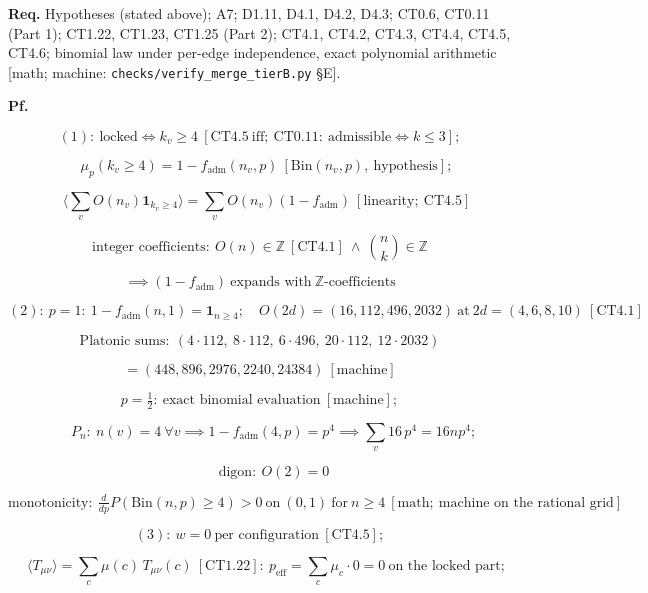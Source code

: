 \begin{theorem}[{\texorpdfstring{CT4.5a — The flicker-dust ensemble: exact density polynomial and rate-invariant $w=0$}{CT4.5a - The flicker-dust ensemble: exact density polynomial and rate-invariant}}]
\textbf{Req.} Hypotheses (stated above); A7; D1.11, D4.1, D4.2, D4.3; CT0.6, CT0.11 (Part 1); CT1.22, CT1.23, CT1.25 (Part 2); CT4.1, CT4.2, CT4.3, CT4.4, CT4.5, CT4.6; binomial law under per-edge independence, exact polynomial arithmetic [math; machine: \texttt{checks/\allowbreak{}verify\_\allowbreak{}merge\_\allowbreak{}tierB.py} §E].

\textbf{Pf.}

\[
(1):\ \text{locked}\iff k_v\ge4\ [\mathrm{CT4.5}\ \text{iff};\ \mathrm{CT0.11}:\ \text{admissible}\iff k\le3];
\]

\[
\quad \mu_p(k_v\ge4)=1-f_{\mathrm{adm}}(n_v,p)\ [\mathrm{Bin}(n_v,p),\ \text{hypothesis}];
\]

\[
\quad \bigl\langle\textstyle\sum_v O(n_v)\mathbf 1_{k_v\ge4}\bigr\rangle=\sum_v O(n_v)(1-f_{\mathrm{adm}})\ [\text{linearity};\ \mathrm{CT4.5}]
\]

\[
\text{integer coefficients}:\ O(n)\in\mathbb Z\ [\mathrm{CT4.1}]\ \wedge\ \binom{n}{k}\in\mathbb Z
\]

\[
\implies (1-f_{\mathrm{adm}})\ \text{expands with}\ \mathbb Z\text{-coefficients}
\]

\[
(2):\ p{=}1:\ 1-f_{\mathrm{adm}}(n,1)=\mathbf 1_{n\ge4};\quad O(2d)=(16,112,496,2032)\ \text{at}\ 2d=(4,6,8,10)\ [\mathrm{CT4.1}]
\]

\[
\text{Platonic sums}:\ (4\cdot112,\ 8\cdot112,\ 6\cdot496,\ 20\cdot112,\ 12\cdot2032)
\]

\[
= (448,896,2976,2240,24384)\ [\text{machine}]
\]

\[
p=\tfrac12:\ \text{exact binomial evaluation}\ [\text{machine}];
\]

\[
\qquad P_n:\ n(v)=4\ \forall v\implies1-f_{\mathrm{adm}}(4,p)=p^4\implies\textstyle\sum_v16\,p^4=16np^4;
\]

\[
\qquad \text{digon}:\ O(2)=0
\]

\[
\text{monotonicity}:\ \tfrac{d}{dp}P(\mathrm{Bin}(n,p)\ge4)>0\ \text{on}\ (0,1)\ \text{for}\ n\ge4\ [\text{math};\ \text{machine on the rational grid}]
\]

\[
(3):\ w=0\ \text{per configuration}\ [\mathrm{CT4.5}];
\]

\[
\quad \langle T_{\mu\nu}\rangle=\textstyle\sum_c\mu(c)\,T_{\mu\nu}(c)\ [\mathrm{CT1.22}]:\ p_{\mathrm{eff}}=\sum_c\mu_c\cdot0=0\ \text{on the locked part};
\]


\end{theorem}
